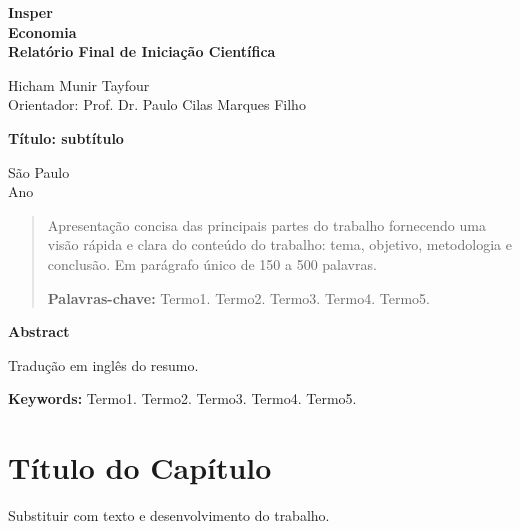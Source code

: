 \documentclass[a4paper,12pt]{article}
\begin{document}
\begin{titlepage}
    \begin{center}
        \vspace*{2cm}
        
        \Large{\textbf{Insper}}\\
        \Large{\textbf{Economia}}\\
        \Large{\textbf{Relatório Final de Iniciação Científica}}
        
        \vfill
        
        \large{Hicham Munir Tayfour}\\
        \large{Orientador: Prof. Dr. Paulo Cilas Marques Filho}
        
        \vfill
        
        \Large{\textbf{Título: subtítulo}}
        
        \vfill
        
        \large{São Paulo}\\
        \large{Ano}
        
    \end{center}
\end{titlepage}

\begin{abstract}
    Apresentação concisa das principais partes do trabalho fornecendo uma visão rápida e clara do conteúdo do trabalho: tema, objetivo, metodologia e conclusão. Em parágrafo único de 150 a 500 palavras.
    
    \textbf{Palavras-chave:} Termo1. Termo2. Termo3. Termo4. Termo5.
\end{abstract}
\newpage

\begin{center}
    \textbf{Abstract}
\end{center}
    Tradução em inglês do resumo.
    
    \textbf{Keywords:} Termo1. Termo2. Termo3. Termo4. Termo5.
\newpage

\tableofcontents
\thispagestyle{empty} %
\newpage
\setcounter{page}{1} %
\justify
\onehalfspacing

\pagestyle{fancy}
\fancyhf{}
\rhead{\thepage}
\newpage

\section{Título do Capítulo}
Substituir com texto e desenvolvimento do trabalho.
\end{document}
